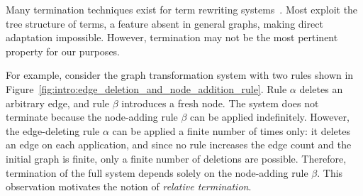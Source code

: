 Many termination techniques exist for term rewriting systems~\cite{nipkow1998term, dershowitz1982orderings, middeldorp1997simple, arts2000termination,contejean2005mechanically,urbain2004modular,contejean2011automated,giesl2014proving}.  
Most exploit the tree structure of terms, a feature absent in general graphs, making direct adaptation impossible. 
However, termination may not be the most pertinent property for our purposes. 

For example, consider the graph transformation system with two rules shown in Figure~\ref{fig:intro:edge_deletion_and_node_addition_rule}. Rule $\alpha$ deletes an arbitrary edge, and rule $\beta$ introduces a fresh node. The system does not terminate because the node-adding rule $\beta$ can be applied indefinitely. However, the edge-deleting rule $\alpha$ can be applied a finite number of times only: it deletes an edge on each application, and since no rule increases the edge count and the initial graph is finite, only a finite number of deletions are possible. Therefore, termination of the full system depends solely on the node-adding rule $\beta$. This observation motivates the notion of \emph{relative termination}.

